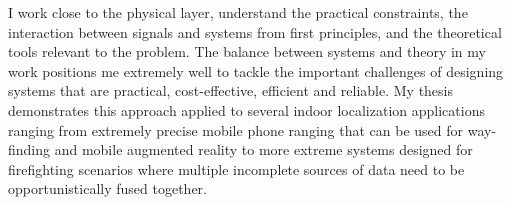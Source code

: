 \documentclass[10pt]{article}
\begin{document}
I work close to the physical layer, understand the practical constraints, the interaction between signals and systems from first principles, and the theoretical tools relevant to the problem. %
The balance between systems and theory in my work positions me extremely well to tackle the important challenges of designing systems that are practical, cost-effective, efficient and reliable.
My thesis demonstrates this approach applied to several indoor localization applications ranging from extremely precise mobile phone ranging that can be used for way-finding and mobile augmented reality to more extreme systems designed for firefighting scenarios where multiple incomplete sources of data need to be opportunistically fused together.  




\end{document}
